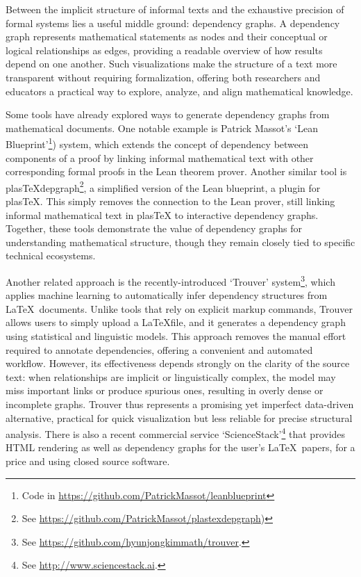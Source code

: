 \documentclass{article}
\begin{document}
Between the implicit structure of informal texts and the exhaustive precision of formal systems lies a useful middle ground: dependency graphs. A dependency graph represents mathematical statements as nodes and their conceptual or logical relationships as edges, providing a readable overview of how results depend on one another. Such visualizations make the structure of a text more transparent without requiring formalization, offering both researchers and educators a practical way to explore, analyze, and align mathematical knowledge.

Some tools have already explored ways to generate dependency graphs from mathematical documents. One notable example is Patrick Massot’s `Lean Blueprint'\footnote{Code in \url{https://github.com/PatrickMassot/leanblueprint}})  system, which extends the concept of dependency between components of a proof by linking informal mathematical text with other corresponding formal proofs in the Lean theorem prover. Another similar tool is plasTeXdepgraph\footnote{See \url{https://github.com/PatrickMassot/plastexdepgraph})}, a simplified version of the Lean blueprint, a plugin for plasTeX.
This simply removes the connection to the Lean prover, still linking informal mathematical text in plasTeX to interactive dependency graphs. Together, these tools demonstrate the value of dependency graphs for understanding mathematical structure, though they remain closely tied to specific technical ecosystems.

Another related approach is the recently-introduced `Trouver' system\footnote{See \url{https://github.com/hyunjongkimmath/trouver}.}, which applies machine learning to automatically infer dependency structures from \LaTeX\ documents. 
Unlike tools that rely on explicit markup commands, Trouver allows users to simply upload a \LaTeX file, and it generates a dependency graph using statistical and linguistic models. This approach removes the manual effort required to annotate dependencies, offering a convenient and automated workflow. 
However, its effectiveness depends strongly on the clarity of the source text: when relationships are implicit or linguistically complex, the model may miss important links or produce spurious ones, resulting in overly dense or incomplete graphs. Trouver thus
represents a promising yet imperfect data-driven alternative, practical for quick visualization but less reliable for precise structural analysis.
%
There is also a recent commercial service `ScienceStack'\footnote{See \url{http://www.sciencestack.ai}.} that provides HTML rendering as well as dependency graphs for the user's \LaTeX\ papers, for a price and using closed source software.
\end{document}
